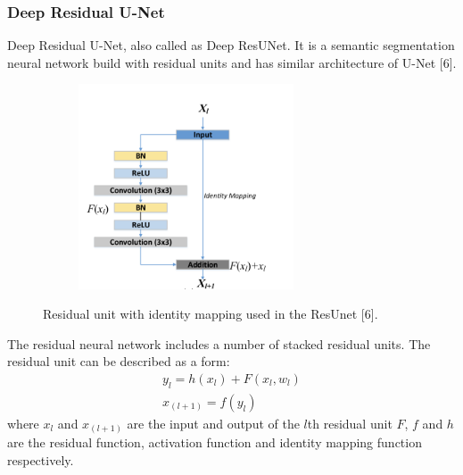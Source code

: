 \documentclass[conference]{IEEEtran}
\begin{document}
\subsubsection{Deep Residual U-Net}
Deep Residual U-Net, also called as Deep ResUNet. It is a semantic segmentation neural network build with residual units and has similar architecture of U-Net [6].
\begin{figure}[h]
    \centering
    \begin{subfigure}[t]{0.4\textwidth}
        \centering
        \includegraphics[width=0.7\textwidth]{group/Picture5.png}
    \end{subfigure}%
    \caption{Residual unit with identity mapping used in the ResUnet [6].}
\end{figure}
The residual neural network includes a number of stacked residual units. The residual unit can be described as a form:
\begin{gather*}
    y_l=h(x_l)+F(x_l,w_l)\\
    x_(l+1)=f(y_l)
\end{gather*} 
where $x_l$ and $x_{(l+1)}$ are the input and output of the $l$th residual unit $F$, $f$ and $h$ are the residual function, activation function and identity mapping function respectively.
\end{document}
